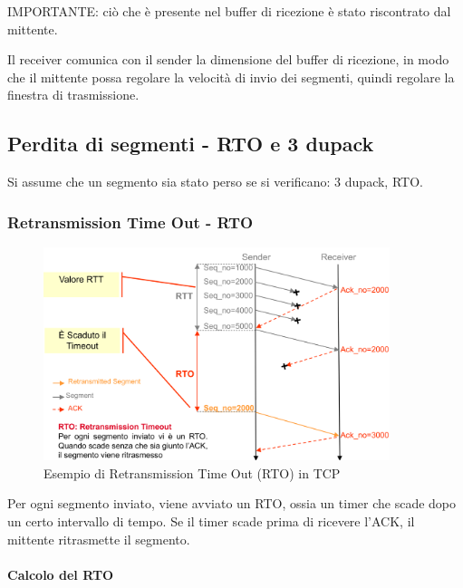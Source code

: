 IMPORTANTE: ciò che è presente nel buffer di ricezione è stato riscontrato dal mittente.

Il receiver comunica con il sender la dimensione del buffer di ricezione, in modo che il mittente possa regolare la velocità di invio dei segmenti, quindi regolare la finestra di trasmissione.


\newpage
\subsection{Perdita di segmenti - RTO e 3 dupack} 
Si assume che un segmento sia stato perso se si verificano: 3 dupack, RTO.

 \subsubsection{Retransmission Time Out - RTO}
\begin{figure}[h!]
    \centering
    \includegraphics[width=0.9\textwidth]{images/rtotcp.png}
    \caption{Esempio di Retransmission Time Out (RTO) in TCP}
    \label{fig:rtotcp}
\end{figure}
Per ogni segmento inviato, viene avviato un RTO, ossia un timer che scade dopo un certo intervallo di tempo. Se il timer scade prima di ricevere l'ACK, il mittente ritrasmette il segmento.
\paragraph{Calcolo del RTO}



\newpage

